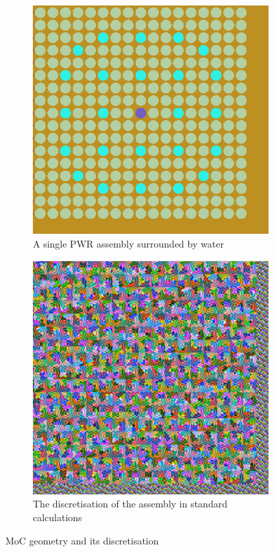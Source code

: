 \documentclass{article}
\begin{document}
\begin{figure}[h!]
     \centering
    \begin{subfigure}[t]{0.45\textwidth}%
    \captionsetup{justification=centering}
         \includegraphics[scale=0.65]{assembly.png}%
         \caption{A single PWR assembly surrounded by water}
         \label{fig:C5G7}
    \end{subfigure}
    \begin{subfigure}[t]{0.45\textwidth}
    \captionsetup{justification=centering}
         \includegraphics[scale=0.555]{assembly_disc.png} 
	       \caption{The discretisation of the assembly in standard calculations} 
	       \label{fig:MGMC_cells}
    \end{subfigure}
  
    \caption{MoC geometry and its discretisation}
    \label{fig:disc}
\end{figure}
\end{document}

